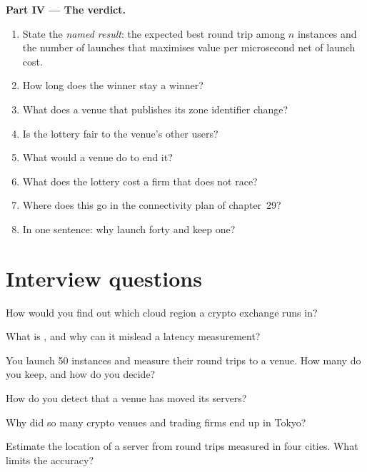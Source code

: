 \begin{problem}
\medskip\noindent\textbf{Part IV --- The verdict.}
\begin{enumerate}[resume]
\item State the \emph{named result}: the expected best round trip among $n$ instances and the number of launches that maximises value per microsecond net
  of launch cost.
\item How long does the winner stay a winner?
\item What does a venue that publishes its zone identifier change?
\item Is the lottery fair to the venue's other users?
\item What would a venue do to end it?
\item What does the lottery cost a firm that does not race?
\item Where does this go in the connectivity plan of chapter~29?
\item In one sentence: why launch forty and keep one?
\end{enumerate}
\end{problem}

\section{Interview questions}

\begin{interviewq}\label{iq:nw:where-the-crypto-venues-live:1}
How would you find out which cloud region a crypto exchange runs in?
\end{interviewq}

\begin{interviewq}\label{iq:nw:where-the-crypto-venues-live:2}
What is , and why can it mislead a latency measurement?
\end{interviewq}

\begin{interviewq}\label{iq:nw:where-the-crypto-venues-live:3}
You launch 50 instances and measure their round trips to a venue. How many do you keep, and how do you decide?
\end{interviewq}

\begin{interviewq}\label{iq:nw:where-the-crypto-venues-live:4}
How do you detect that a venue has moved its servers?
\end{interviewq}

\begin{interviewq}\label{iq:nw:where-the-crypto-venues-live:5}
Why did so many crypto venues and trading firms end up in Tokyo?
\end{interviewq}

\begin{interviewq}\label{iq:nw:where-the-crypto-venues-live:6}
Estimate the location of a server from round trips measured in four cities. What limits the accuracy?
\end{interviewq}
